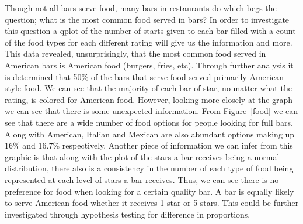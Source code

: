 \documentclass[11pt]{article}
\begin{document}
Though not all bars serve food, many bars in restaurants do which begs the question; what is the most common food served in bars?  In order to investigate this question a qplot of the number of starts given to each bar filled with a count of the food types for each different rating will give us the information and more.  This data revealed, unsurprisingly, that the most common food served in American bars is American food (burgers, fries, etc). Through further analysis it is determined that 50$\%$ of the bars that serve food served primarily American style food.  We can see that the majority of each bar of star, no matter what the rating, is colored for American food.  However, looking more closely at the graph we can see that there is some unexpected information.  From Figure~\ref{food} we can see that there are a wide number of food options for people looking for full bars.  Along with American, Italian and Mexican are also abundant options making up 16$\%$ and 16.7$\%$ respectively.  Another piece of information we can infer from this graphic is that along with the plot of the stars a bar receives being a normal distribution, there also is a consistency in the number of each type of food being represented at each level of stars a bar receives.  Thus, we can see there is no preference for food when looking for a certain quality bar. A bar is equally likely to serve American food whether it receives 1 star or 5 stars.  This could be further investigated through hypothesis testing for difference in proportions.
\end{document}
